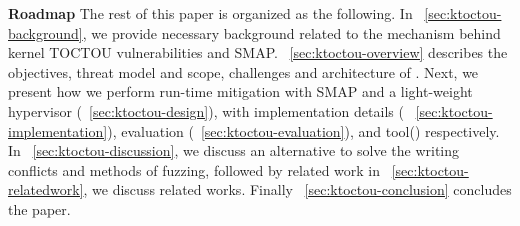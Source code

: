 \textbf{Roadmap}
The rest of this paper is organized as the following. 
In ~\autoref{sec:ktoctou-background}, we provide necessary background related to the mechanism behind kernel TOCTOU vulnerabilities and SMAP. ~\autoref{sec:ktoctou-overview} describes the objectives, threat model and scope, challenges and architecture of \name. Next, we present how we perform run-time mitigation with SMAP and a light-weight hypervisor (~\autoref{sec:ktoctou-design}),  with implementation details ( ~\autoref{sec:ktoctou-implementation}), evaluation (~\autoref{sec:ktoctou-evaluation}), and tool() respectively.  In ~\autoref{sec:ktoctou-discussion},  we discuss an alternative to solve the writing conflicts and methods of fuzzing, followed by related work in ~\autoref{sec:ktoctou-relatedwork}, we discuss related works. Finally ~\autoref{sec:ktoctou-conclusion} concludes the paper.
